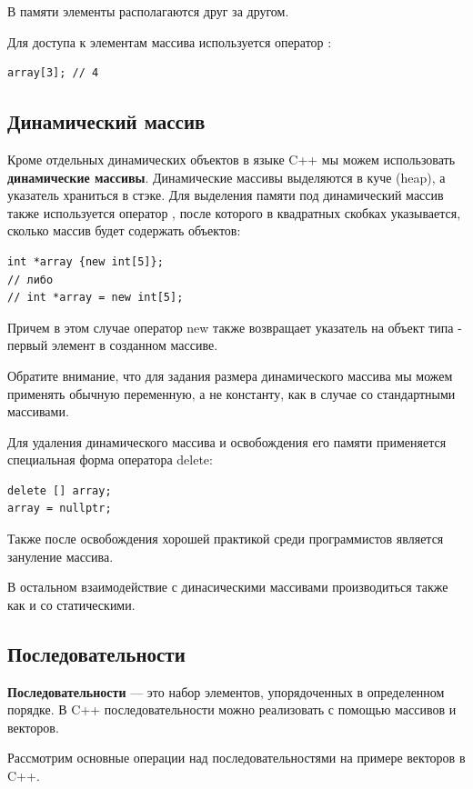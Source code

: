 В памяти элементы располагаются друг за другом.

Для доступа к элементам массива используется оператор \mverb{[]}:
\begin{verbatim}
array[3]; // 4
\end{verbatim}

\subsection{Динамический массив}

Кроме отдельных динамических объектов в языке C++ мы можем использовать \textbf{динамические массивы}. Динамические массивы выделяются в куче (heap), а указатель храниться в стэке. Для выделения памяти под динамический массив также используется оператор , после которого в квадратных скобках указывается, сколько массив будет содержать объектов:

\begin{verbatim}
int *array {new int[5]};
// либо
// int *array = new int[5];
\end{verbatim}

Причем в этом случае оператор new также возвращает указатель на объект типа  - первый элемент в созданном массиве.

Обратите внимание, что для задания размера динамического массива мы можем применять обычную переменную, а не константу, как в случае со стандартными массивами.

Для удаления динамического массива и освобождения его памяти применяется специальная форма оператора delete:
\begin{verbatim}
delete [] array;
array = nullptr;
\end{verbatim}

Также после освобождения хорошей практикой среди программистов является зануление массива.

В остальном взаимодействие с динасическими массивами производиться также как и со статическими.

\subsection{Последовательности}

\textbf{Последовательности} — это набор элементов, упорядоченных в определенном порядке. В C++ последовательности можно реализовать с помощью массивов и векторов.

Рассмотрим основные операции над последовательностями на примере векторов в C++.

